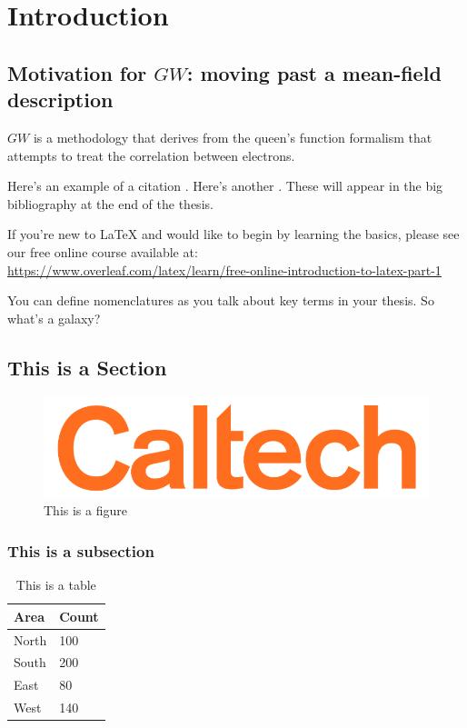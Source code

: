 \documentclass[12pt]{caltech_thesis}
\begin{document}
\mainmatter

\chapter{Introduction}
\section{Motivation for $GW$: moving past a mean-field description}
$GW$ is a methodology that derives from the queen's function formalism that attempts to treat the correlation between electrons. 

Here's an example of a citation \citep{GMP81}. Here's another \citep{PP98}. These will appear in the big bibliography at the end of the thesis.

If you're new to \LaTeX{} and would like to begin by learning the basics, please see our free online course available at:\\ \url{https://www.overleaf.com/latex/learn/free-online-introduction-to-latex-part-1} 

You can define nomenclatures  as you talk about key terms in your thesis. So what's a galaxy? 


\section{This is a Section}
\lipsum[1-2]

\begin{figure}[hbt!]
\centering
\includegraphics[width=.3\textwidth]{caltech.png}
\caption{This is a figure}\label{fig:logo}
\end{figure}

\subsection{This is a subsection}

\begin{table}[hbt!]
\centering
\begin{tabular}{ll}
\hline
Area & Count\\
\hline
North & 100\\
South & 200\\
East & 80\\
West & 140\\
\hline
\end{tabular}
\caption{This is a table}\label{tab:sample}
\end{table}
\end{document}
